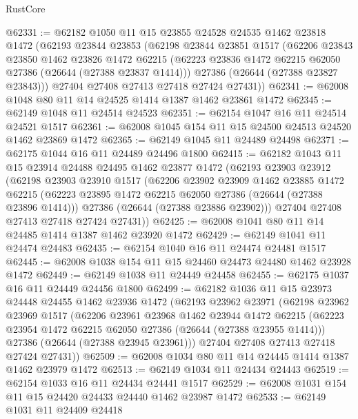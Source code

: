 \begin{lexlean}{RustCore}
\begin{coremodule}
@62331 := @62182
    @1050
    @11
    @15
    @23855
    @24528
    @24535
    @1462
    @23818
    @1472
    (@62193
      @23844
      @23853
      (@62198
        @23844
        @23851
        @1517
        (@62206
          @23843
          @23850
          @1462
          @23826
          @1472
          @62215
          (@62223 @23836 @1472 @62215 @62050 @27386 (@26644 (@27388 @23837 @1414)))
          @27386
          (@26644 (@27388 @23827 @23843)))
        @27404
        @27408
        @27413
        @27418
        @27424
        @27431))
@62341 := @62008 @1048 @80 @11 @14 @24525 @1414 @1387 @1462 @23861 @1472
@62345 := @62149 @1048 @11 @24514 @24523
@62351 := @62154 @1047 @16 @11 @24514 @24521 @1517
@62361 := @62008 @1045 @154 @11 @15 @24500 @24513 @24520 @1462 @23869 @1472
@62365 := @62149 @1045 @11 @24489 @24498
@62371 := @62175 @1044 @16 @11 @24489 @24496 @1800
@62415 := @62182
    @1043
    @11
    @15
    @23914
    @24488
    @24495
    @1462
    @23877
    @1472
    (@62193
      @23903
      @23912
      (@62198
        @23903
        @23910
        @1517
        (@62206
          @23902
          @23909
          @1462
          @23885
          @1472
          @62215
          (@62223 @23895 @1472 @62215 @62050 @27386 (@26644 (@27388 @23896 @1414)))
          @27386
          (@26644 (@27388 @23886 @23902)))
        @27404
        @27408
        @27413
        @27418
        @27424
        @27431))
@62425 := @62008 @1041 @80 @11 @14 @24485 @1414 @1387 @1462 @23920 @1472
@62429 := @62149 @1041 @11 @24474 @24483
@62435 := @62154 @1040 @16 @11 @24474 @24481 @1517
@62445 := @62008 @1038 @154 @11 @15 @24460 @24473 @24480 @1462 @23928 @1472
@62449 := @62149 @1038 @11 @24449 @24458
@62455 := @62175 @1037 @16 @11 @24449 @24456 @1800
@62499 := @62182
    @1036
    @11
    @15
    @23973
    @24448
    @24455
    @1462
    @23936
    @1472
    (@62193
      @23962
      @23971
      (@62198
        @23962
        @23969
        @1517
        (@62206
          @23961
          @23968
          @1462
          @23944
          @1472
          @62215
          (@62223 @23954 @1472 @62215 @62050 @27386 (@26644 (@27388 @23955 @1414)))
          @27386
          (@26644 (@27388 @23945 @23961)))
        @27404
        @27408
        @27413
        @27418
        @27424
        @27431))
@62509 := @62008 @1034 @80 @11 @14 @24445 @1414 @1387 @1462 @23979 @1472
@62513 := @62149 @1034 @11 @24434 @24443
@62519 := @62154 @1033 @16 @11 @24434 @24441 @1517
@62529 := @62008 @1031 @154 @11 @15 @24420 @24433 @24440 @1462 @23987 @1472
@62533 := @62149 @1031 @11 @24409 @24418

\end{coremodule}
\end{lexlean}
